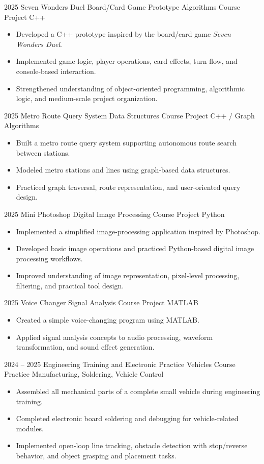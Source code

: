 \documentclass[10pt,a4paper,sans]{moderncv}
\begin{document}
\cventry
{2025}
{Seven Wonders Duel Board/Card Game Prototype}
{Algorithms Course Project}
{C++}
{}
{
\begin{itemize}
    \item Developed a C++ prototype inspired by the board/card game \textit{Seven Wonders Duel}.
    \item Implemented game logic, player operations, card effects, turn flow, and console-based interaction.
    \item Strengthened understanding of object-oriented programming, algorithmic logic, and medium-scale project organization.
\end{itemize}
}

\cventry
{2025}
{Metro Route Query System}
{Data Structures Course Project}
{C++ / Graph Algorithms}
{}
{
\begin{itemize}
    \item Built a metro route query system supporting autonomous route search between stations.
    \item Modeled metro stations and lines using graph-based data structures.
    \item Practiced graph traversal, route representation, and user-oriented query design.
\end{itemize}
}

\cventry
{2025}
{Mini Photoshop}
{Digital Image Processing Course Project}
{Python}
{}
{
\begin{itemize}
    \item Implemented a simplified image-processing application inspired by Photoshop.
    \item Developed basic image operations and practiced Python-based digital image processing workflows.
    \item Improved understanding of image representation, pixel-level processing, filtering, and practical tool design.
\end{itemize}
}

\cventry
{2025}
{Voice Changer}
{Signal Analysis Course Project}
{MATLAB}
{}
{
\begin{itemize}
    \item Created a simple voice-changing program using MATLAB.
    \item Applied signal analysis concepts to audio processing, waveform transformation, and sound effect generation.
\end{itemize}
}

\cventry
{2024 -- 2025}
{Engineering Training and Electronic Practice Vehicles}
{Course Practice}
{Manufacturing, Soldering, Vehicle Control}
{}
{
\begin{itemize}
    \item Assembled all mechanical parts of a complete small vehicle during engineering training.
    \item Completed electronic board soldering and debugging for vehicle-related modules.
    \item Implemented open-loop line tracking, obstacle detection with stop/reverse behavior, and object grasping and placement tasks.
\end{itemize}
}
\end{document}
